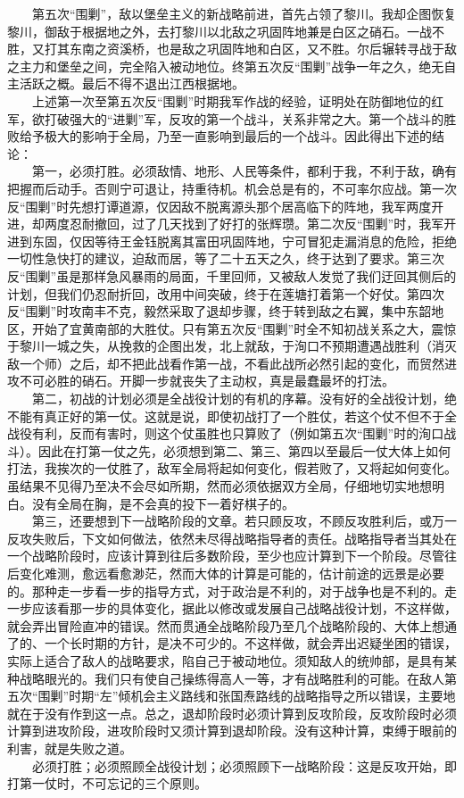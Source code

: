 \documentclass[cn,11pt,chinese]{elegantbook}
\begin{document}
　　第五次“围剿”，敌以堡垒主义的新战略前进，首先占领了黎川。我却企图恢复黎川，御敌于根据地之外，去打黎川以北敌之巩固阵地兼是白区之硝石。一战不胜，又打其东南之资溪桥，也是敌之巩固阵地和白区，又不胜。尔后辗转寻战于敌之主力和堡垒之间，完全陷入被动地位。终第五次反“围剿”战争一年之久，绝无自主活跃之概。最后不得不退出江西根据地。\\
　　上述第一次至第五次反“围剿”时期我军作战的经验，证明处在防御地位的红军，欲打破强大的“进剿”军，反攻的第一个战斗，关系非常之大。第一个战斗的胜败给予极大的影响于全局，乃至一直影响到最后的一个战斗。因此得出下述的结论：\\
　　第一，必须打胜。必须敌情、地形、人民等条件，都利于我，不利于敌，确有把握而后动手。否则宁可退让，持重待机。机会总是有的，不可率尔应战。第一次反“围剿”时先想打谭道源，仅因敌不脱离源头那个居高临下的阵地，我军两度开进，却两度忍耐撤回，过了几天找到了好打的张辉瓒。第二次反“围剿”时，我军开进到东固，仅因等待王金钰脱离其富田巩固阵地，宁可冒犯走漏消息的危险，拒绝一切性急快打的建议，迫敌而居，等了二十五天之久，终于达到了要求。第三次反“围剿”虽是那样急风暴雨的局面，千里回师，又被敌人发觉了我们迂回其侧后的计划，但我们仍忍耐折回，改用中间突破，终于在莲塘打着第一个好仗。第四次反“围剿”时攻南丰不克，毅然采取了退却步骤，终于转到敌之右翼，集中东韶地区，开始了宜黄南部的大胜仗。只有第五次反“围剿”时全不知初战关系之大，震惊于黎川一城之失，从挽救的企图出发，北上就敌，于洵口不预期遭遇战胜利（消灭敌一个师）之后，却不把此战看作第一战，不看此战所必然引起的变化，而贸然进攻不可必胜的硝石。开脚一步就丧失了主动权，真是最蠢最坏的打法。\\
　　第二，初战的计划必须是全战役计划的有机的序幕。没有好的全战役计划，绝不能有真正好的第一仗。这就是说，即使初战打了一个胜仗，若这个仗不但不于全战役有利，反而有害时，则这个仗虽胜也只算败了（例如第五次“围剿”时的洵口战斗）。因此在打第一仗之先，必须想到第二、第三、第四以至最后一仗大体上如何打法，我挨次的一仗胜了，敌军全局将起如何变化，假若败了，又将起如何变化。虽结果不见得乃至决不会尽如所期，然而必须依据双方全局，仔细地切实地想明白。没有全局在胸，是不会真的投下一着好棋子的。\\
　　第三，还要想到下一战略阶段的文章。若只顾反攻，不顾反攻胜利后，或万一反攻失败后，下文如何做法，依然未尽得战略指导者的责任。战略指导者当其处在一个战略阶段时，应该计算到往后多数阶段，至少也应计算到下一个阶段。尽管往后变化难测，愈远看愈渺茫，然而大体的计算是可能的，估计前途的远景是必要的。那种走一步看一步的指导方式，对于政治是不利的，对于战争也是不利的。走一步应该看那一步的具体变化，据此以修改或发展自己战略战役计划，不这样做，就会弄出冒险直冲的错误。然而贯通全战略阶段乃至几个战略阶段的、大体上想通了的、一个长时期的方针，是决不可少的。不这样做，就会弄出迟疑坐困的错误，实际上适合了敌人的战略要求，陷自己于被动地位。须知敌人的统帅部，是具有某种战略眼光的。我们只有使自己操练得高人一等，才有战略胜利的可能。在敌人第五次“围剿”时期“左”倾机会主义路线和张国焘路线的战略指导之所以错误，主要地就在于没有作到这一点。总之，退却阶段时必须计算到反攻阶段，反攻阶段时必须计算到进攻阶段，进攻阶段时又须计算到退却阶段。没有这种计算，束缚于眼前的利害，就是失败之道。\\
　　必须打胜；必须照顾全战役计划；必须照顾下一战略阶段：这是反攻开始，即打第一仗时，不可忘记的三个原则。\\
\end{document}
